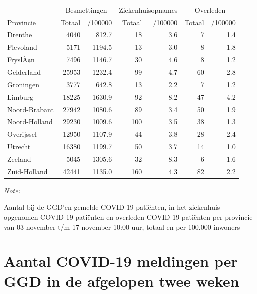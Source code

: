 \documentclass[
  english,
  man,floatsintext]{apa6}
\begin{document}
\begin{table}
\centering
\begin{threeparttable}
\begin{tabular}{lrrrrrr}
\toprule
\multicolumn{1}{c}{ } & \multicolumn{2}{c}{Besmettingen} & \multicolumn{2}{c}{Ziekenhuisopnames} & \multicolumn{2}{c}{Overleden} \\
\cmidrule(l{3pt}r{3pt}){2-3} \cmidrule(l{3pt}r{3pt}){4-5} \cmidrule(l{3pt}r{3pt}){6-7}
Provincie & Totaal & /100000 & Totaal & /100000 & Totaal & /100000\\
\midrule
Drenthe & 4040 & 812.7 & 18 & 3.6 & 7 & 1.4\\
Flevoland & 5171 & 1194.5 & 13 & 3.0 & 8 & 1.8\\
FryslÃ¢n & 7496 & 1146.7 & 30 & 4.6 & 8 & 1.2\\
Gelderland & 25953 & 1232.4 & 99 & 4.7 & 60 & 2.8\\
Groningen & 3777 & 642.8 & 13 & 2.2 & 7 & 1.2\\
Limburg & 18225 & 1630.9 & 92 & 8.2 & 47 & 4.2\\
Noord-Brabant & 27942 & 1080.6 & 89 & 3.4 & 50 & 1.9\\
Noord-Holland & 29230 & 1009.6 & 100 & 3.5 & 38 & 1.3\\
Overijssel & 12950 & 1107.9 & 44 & 3.8 & 28 & 2.4\\
Utrecht & 16380 & 1199.7 & 50 & 3.7 & 14 & 1.0\\
Zeeland & 5045 & 1305.6 & 32 & 8.3 & 6 & 1.6\\
Zuid-Holland & 42441 & 1135.0 & 160 & 4.3 & 82 & 2.2\\
\bottomrule
\end{tabular}
\begin{tablenotes}
\item \textit{Note: } 
\item Aantal bij de GGD’en gemelde COVID-19 patiënten, in het ziekenhuis opgenomen COVID-19 patiënten en overleden COVID-19 patiënten per provincie van 03 november t/m 17 november 10:00 uur, totaal en per 100.000 inwoners
\end{tablenotes}
\end{threeparttable}
\end{table}

\newpage

\hypertarget{aantal-covid-19-meldingen-per-ggd-in-de-afgelopen-twee-weken}{%
\section{Aantal COVID-19 meldingen per GGD in de afgelopen twee weken}\label{aantal-covid-19-meldingen-per-ggd-in-de-afgelopen-twee-weken}}
\end{document}
